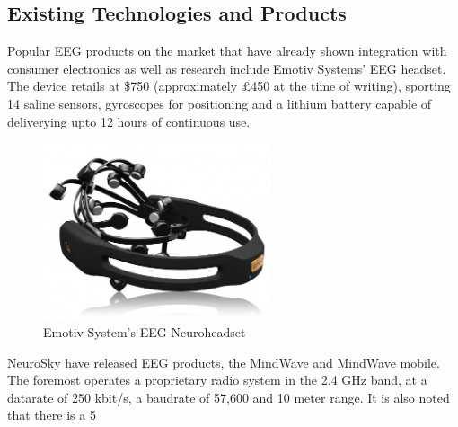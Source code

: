 \documentclass[]{article}
\begin{document}
\subsection{Existing Technologies and Products}

Popular \ac{EEG} products on the market that have already shown integration with consumer electronics as well as research include Emotiv Systems' \ac{EEG} headset. The device retails at \$750 (approximately £450 at the time of writing), sporting 14 saline sensors, gyroscopes for positioning and a lithium battery capable of deliverying upto 12 hours of continuous use.

\begin{figure}[htb]
	\begin{center}
		\includegraphics[width = 0.6\textwidth]{emotive}
	\end{center}
	\caption{Emotiv System's \ac{EEG} Neuroheadset}
	\label{fig:emotive}
\end{figure}

NeuroSky have released \ac{EEG} products, the MindWave and MindWave mobile. The foremost operates a proprietary radio system in the 2.4 GHz band, at a datarate of 250 kbit/s, a baudrate of 57,600 and 10 meter range. It is also noted that there is a 5%
\end{document}
